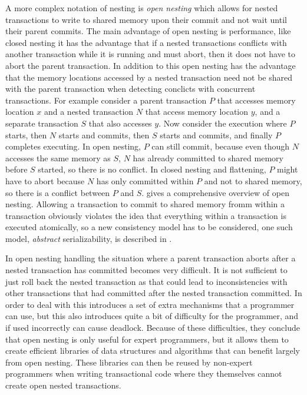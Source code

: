 A more complex notation of nesting is \emph{open nesting} which allows for nested 
transactions to write to shared memory upon their commit and not wait until their parent commits.
The main advantage of open nesting is performance, like closed nesting it has the 
advantage that if a nested transactions conflicts with another transaction while it 
is running and must abort, then it does not have to abort the parent transaction.
In addition to this open nesting has the advantage that the memory locations accessed
 by a nested transaction need not be shared with the parent transaction when detecting conclicts with concurrent transactions.
For example consider a parent transaction $P$ that accesses memory location $x$ and a 
nested transaction $N$ that access memory location $y$, and a separate transaction $S$ that also accesses $y$.
Now consider the execution where $P$ starts, then $N$ starts and commits, then $S$ starts 
and commits, and finally $P$ completes executing.
In open nesting, $P$ can still commit, because even though $N$ accesses the same memory
 as $S$, $N$ has already committed to shared memory before $S$ started, so there is no conflict. 
In closed nesting and flattening, $P$ might have to abort because $N$ has only committed
 within $P$ and not to shared memory, so there is a conflict between $P$ and $S$.
\cite{_opennested} gives a comprehensive overview of open nesting.
Allowing a transaction to commit to shared memory fromm within a transaction 
obviously violates the idea that everything within a transaction is executed atomically,
 so a new consistency model has to be considered, one such model, \emph{abstract} serializability,
 is described  in \cite{1229442}.

In open nesting handling the situation where a parent transaction aborts after a nested
 transaction has committed becomes very difficult.
It is not sufficient to just roll back the nested transaction as that could lead to
 inconsistencies with other transactions that had committed after the nested transaction committed.
In order to deal with this \cite{1229442} introduces a set of extra mechanisms that
 a programmer can use, but this also introduces quite a bit of difficulty for the 
programmer, and if used incorrectly can cause deadlock.
Because of these difficulties, they \cite{1229442} conclude that open nesting is only
 useful for expert programmers, but it allows them to create efficient libraries of
 data structures and algorithms that can benefit largely from open nesting.
These libraries can then be reused by non-expert programmers when writing
 transactional code where they themselves cannot create open nested transactions.

